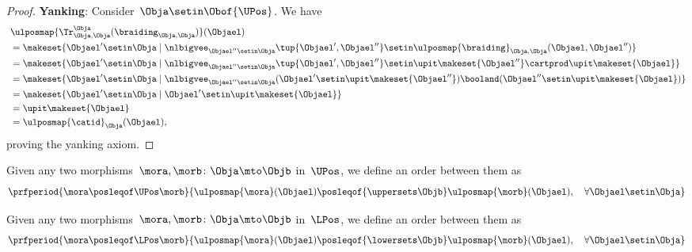 \begin{proof}
    \textbf{Yanking}:
    Consider~$\Obja\setin \Obof{\UPos}$.
    We have
    \begin{equation}
        \begin{aligned}
            ~ & \ulposmap{\Tr_{\Obja,\Obja}^{\Obja}(\braiding_{\Obja,\Obja})}(\Objael) \\
              & =\makeset{ \Objael'\setin \Obja \mid \nlbigvee_{\Objael''\setin \Obja}\tup{\Objael',\Objael''}\setin \ulposmap{\braiding}_{\Obja,\Obja}(\Objael,\Objael'')} \\
              & =\makeset{ \Objael'\setin \Obja \mid \nlbigvee_{\Objael''\setin \Obja}\tup{\Objael',\Objael''}\setin \upit\makeset{\Objael''}\cartprod \upit\makeset{ \Objael}} \\
              & =\makeset{ \Objael'\setin \Obja \mid \nlbigvee_{\Objael''\setin \Obja} (\Objael'\setin \upit\makeset{\Objael''}) \booland(\Objael'' \setin \upit\makeset{ \Objael})} \\
              & =\makeset{ \Objael'\setin \Obja \mid \Objael'\setin \upit\makeset{\Objael}} \\
              & =\upit \makeset{\Objael} \\
              & =\ulposmap{\catid}_\Obja(\Objael),
        \end{aligned}
    \end{equation}
    proving the yanking axiom.
\end{proof}

\begin{definition}
    \label{def:upos_order}
    Given any two morphisms~$\mora,\morb\colon \Obja \mto \Objb$ in~$\UPos$, we define an order between them as
    \begin{equation}
        \prfperiod{\mora \posleqof\UPos \morb}{\ulposmap{\mora}(\Objael)\posleqof{\uppersets \Objb} \ulposmap{\morb}(\Objael), \quad \forall \Objael \setin \Obja}
    \end{equation}
\end{definition}

\begin{definition}
    \label{def:lpos_order}
    Given any two morphisms~$\mora,\morb\colon \Obja \mto \Objb$ in~$\LPos$, we define an order between them as
    \begin{equation}
        \prfperiod{\mora \posleqof\LPos \morb}{\ulposmap{\mora}(\Objael)\posleqof{\lowersets \Objb} \ulposmap{\morb}(\Objael), \quad \forall \Objael \setin \Obja}
    \end{equation}
\end{definition}

